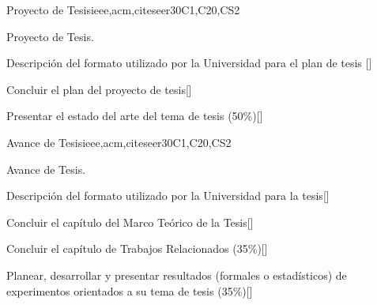 \begin{syllabus}
\begin{unit}{Proyecto de Tesis}{}{ieee,acm,citeseer}{30}{C1,C20,CS2}
   \begin{topics}
      \item Proyecto de Tesis.
   \end{topics}
   \begin{learningoutcomes}
      \item Descripción del formato utilizado por la Universidad para el plan de tesis [\Assessment]
      \item Concluir el plan del proyecto de tesis[\Assessment]
      \item Presentar el estado del arte del tema de tesis (50\%)[\Assessment]
   \end{learningoutcomes}
\end{unit}

\begin{unit}{Avance de Tesis}{}{ieee,acm,citeseer}{30}{C1,C20,CS2}
   \begin{topics}
      \item Avance de Tesis.
   \end{topics}
   \begin{learningoutcomes}
      \item Descripción del formato utilizado por la Universidad para la tesis[\Assessment]
      \item Concluir el capítulo del Marco Teórico de la Tesis[\Assessment]
      \item Concluir el capítulo de Trabajos Relacionados (35\%)[\Assessment]
      \item Planear, desarrollar y presentar resultados (formales o estadísticos) de experimentos orientados a su tema de tesis (35\%)[\Assessment]
   \end{learningoutcomes}
\end{unit}













\begin{coursebibliography}
\end{coursebibliography}
\end{syllabus}
